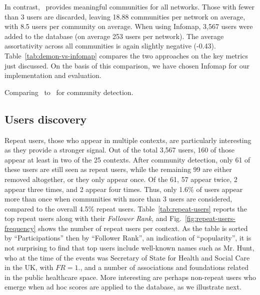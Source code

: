 In contrast, \infomap~provides meaningful communities for all networks.
Those with fewer than 3 users are discarded, leaving  18.88 communities per network on average, with 8.5 users per community on average.
When using Infomap, 3,567 users were added to the database (on average 253 users per network).
The average assortativity across all communities is again slightly negative (-0.43).
%
Table~\ref{tab:demon-vs-infomap} compares the two approaches on the key metrics just discussed. On the basis of this comparison, we have chosen Infomap for  our implementation and evaluation.

\begin{table}
	\vspace{-10pt}
		\tiny
	\resizebox{\textwidth}{!}{
	    
	}
	\caption{Comparing \demon~to \infomap~for community detection.}
	\label{tab:demon-vs-infomap}
	\vspace{-10pt}
\end{table}

\subsection{Users discovery}  \label{sec:users}

Repeat users, those who appear in multiple contexts, are particularly interesting as they provide a stronger signal. 
Out of the total 3,567 users, 160 of those appear at least in two of the 25 contexts.
After community detection, only 61 of these users are still seen as repeat users,
while the remaining 99 are either removed altogether, or they only appear once.
Of the 61, 57 appear twice, 2 appear three times, and 2 appear four times. 
Thus, only 1.6\% of users appear more than once when communities with more than 3 users are considered, compared to the overall 4.5\% repeat users.
%
Table~\ref{tab:repeat-users} reports the top repeat users along with their \textit{Follower Rank}, and Fig.~\ref{fig:repeat-users-frequency} shows the number of repeat users per context.
As the table is sorted by ``Participations'' then by ``Follower Rank'', an indication of ``popularity'',  it is not surprising to find that top users include well-known names such as Mr. Hunt, who at the time of the events was Secretary of State for Health and Social Care in the UK, with $FR =1.$, and a number of associations and foundations related in the public healthcare space.
More interesting are perhaps non-repeat users who emerge when ad hoc scores are applied to the database, as we illustrate next.

